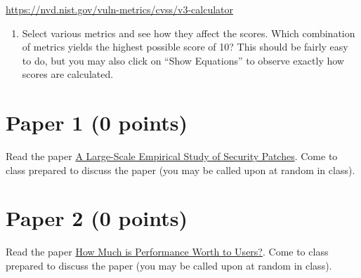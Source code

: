 \documentclass[11pt]{article}
\begin{document}
\noindent \href{https://nvd.nist.gov/vuln-metrics/cvss/v3-calculator}{https://nvd.nist.gov/vuln-metrics/cvss/v3-calculator}

\begin{enumerate}[resume]
    \item Select various metrics and see how they affect the scores. Which combination of metrics yields the highest possible score of 10? This should be fairly easy to do, but you may also click on ``Show Equations'' to observe exactly how scores are calculated. 
\end{enumerate}


\section*{Paper 1 (0 points)}

Read the paper \href{https://dl.acm.org/doi/abs/10.1145/3133956.3134072}{A Large-Scale Empirical Study of Security Patches}. 
Come to class prepared to discuss the paper (you may be called upon at random in class).

\section*{Paper 2 (0 points)}

Read the paper \href{https://dl.acm.org/doi/10.1145/3587135.3592194}{How Much is Performance Worth to Users?}. 
Come to class prepared to discuss the paper (you may be called upon at random in class).
\end{document}
